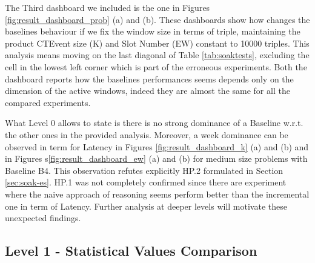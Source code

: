 The Third dashboard we included is the one in Figures \ref{fig:result_dashboard_prob} (a) and (b). These dashboards show how changes the baselines behaviour if we fix the window size in terms of triple, maintaining the product CTEvent size (K) and Slot Number (EW) constant to 10000 triples.
This analysis means moving on the last diagonal of Table \ref{tab:soaktests}, excluding the cell in the lowest left corner which is part of the erroneous experiments. Both the dashboard reports how the baselines performances seems depends only on the dimension of the active windows, indeed they are almost the same for all the compared experiments.

What Level 0 allows to state is there is no strong dominance of a Baseline w.r.t. the other ones in the provided analysis. Moreover, a week dominance can be observed in term for Latency in Figures \ref{fig:result_dashboard_k} (a) and (b) and in Figures s\ref{fig:result_dashboard_ew} (a) and (b) for medium size problems with Baseline B4. This observation refutes explicitly HP.2 formulated in Section \ref{sec:soak-es}. HP.1 was not completely confirmed since there are experiment where the naive approach of reasoning seems perform better than the incremental one in term of Latency. Further analysis at deeper levels will motivate these unexpected findings.

\subsection{Level 1 -  Statistical Values Comparison}

